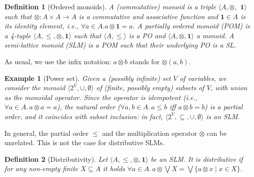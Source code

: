 \documentclass[preprint,12pt]{elsarticle}
\newtheorem{definition}{Definition}
\newtheorem{example}{Example}
\def\1{{\mathbf 1}}
\newcommand{\comment}[1]{}
\def\monid{{\mathbf 0}}
\def\1{{\mathbf 1}}
\def\monop{\otimes}
\def\monid{\mathbf{1}}
\begin{document}
\begin{definition}[Ordered monoids]\label{defn:clm}
	A (commutative) monoid is a triple
	$\langle A, \monop,$ $\1 \rangle$ such that $\monop: A \times A \rightarrow A$ is
	a commutative and associative function and $\1 \in A$ is its \emph{identity} element,
	i.e., $\forall a \in A. a \monop \1 = a$.
	A partially ordered monoid (POM) is a 4-tuple $\langle A, {\leq,} \monop, \1 \rangle$ such that 	
	$\langle A, \leq \rangle$ is a PO and $\langle A, \monop, \1 \rangle$ a monoid.
	A semi-lattice monoid (SLM) is a 
	POM such that their underlying PO is a SL.
\end{definition}

As usual, we use the infix notation: $a \monop b$ stands for $\monop(a,b)$.
\comment{The monoidal operator can be defined for any multi-set: it is given 
	for a family of elements $a_i \in A$ indexed over a non-empty finite
	set $I$, and it is denoted by
	$\bigotimes_{i \in I} a_i$.
	If for an index set $I$ the $a_i$'s are different,
	we write $\bigotimes S$ instead of $\bigotimes_{i \in I} a_i$
	for the set $S = \{a_i \mid i \in I\}$.
	Conventionally, we denote $\bigotimes \emptyset = \bot$.
}

\begin{example}[Power set]\label{ex:powerset}
	Given a (possibly infinite) set $V$ of variables, we consider
	the monoid $\langle 2^V, \cup, \emptyset \rangle$
	of (finite, possibly empty) subsets of $V$, with union as the monoidal operator.
	Since the operator is idempotent (i.e., $\forall a\in A.\, a \monop a = a$), 
	the natural order ($\forall a, b \in A.\, a \leq b$ iff $a \monop b = b$) 
	is a partial order, and 
	it coincides with subset inclusion:
	in fact, $\langle 2^V, \subseteq, \cup, \emptyset \rangle$
	is an SLM.
\end{example}

In general, the partial order $\leq$ and the multiplication operator $\otimes$ can be unrelated.
This is not the case for distributive SLMs.

\begin{definition}[Distributivity]
	\label{dist}
	Let $\langle A, \leq, \monop, \monid \rangle$ be an SLM.
	It is distributive if
	for  any  non-empty finite  $X \subseteq A$
	it holds $\forall a \in A.\,  a \monop  \bigvee X = \bigvee \{a \monop x \mid x \in X\}$.
\end{definition}
\end{document}
